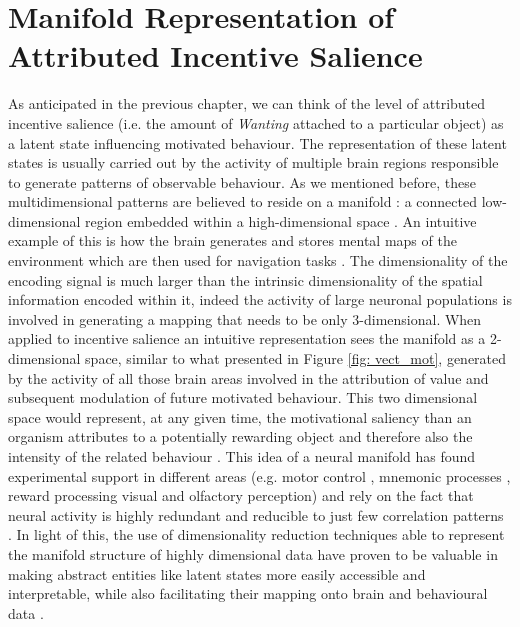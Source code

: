 \section{Manifold Representation of Attributed Incentive Salience}
\label{manifold_rep_incentive_salience}
As anticipated in the previous chapter, we can think of the level of attributed incentive salience (i.e. the amount of \textit{Wanting} attached to a particular object) as a latent state influencing motivated behaviour. The representation of these latent states is usually carried out by the activity of multiple brain regions responsible to generate patterns of observable behaviour. As we mentioned before, these multidimensional patterns are believed to reside on a manifold \cite{seung2000manifold, pang2016dimensionality}: a connected low-dimensional region embedded within a high-dimensional space \cite{bengio2017deep}. An intuitive example of this is how the brain generates and stores mental maps of the environment which are then used for navigation tasks \cite{derdikman2011manifold, nieh2021geometry}. The dimensionality of the encoding signal is much larger than the intrinsic dimensionality of the spatial information encoded within it, indeed the activity of large neuronal populations is involved in generating a mapping that needs to be only 3-dimensional. When applied to incentive salience an intuitive representation sees the manifold as a 2-dimensional space, similar to what presented in Figure \ref{fig: vect_mot}, generated by the activity of all those brain areas involved in the attribution of value and subsequent modulation of future motivated behaviour. This two dimensional space would represent, at any given time, the motivational saliency than an organism attributes to a potentially rewarding object and therefore also the intensity of the related  behaviour \cite{berridge1998role, simpson2016behavioral}. This idea of a neural manifold has found experimental support in different areas (e.g. motor control \cite{gallego2017neural}, mnemonic processes \cite{derdikman2011manifold, nieh2021geometry}, reward processing \cite{bromberg2010coding} visual \cite{seung2000manifold, ganmor2015thesaurus} and olfactory \cite{stopfer2003intensity} perception) and rely on the fact that neural activity is highly redundant and reducible to just few correlation patterns \cite{gallego2017neural}. In light of this, the use of dimensionality reduction techniques able to represent the manifold structure of highly dimensional data have proven to be valuable in making abstract entities like latent states more easily accessible and interpretable, while also facilitating their mapping onto brain \cite{gao2021nonlinear, rue2021decoding} and behavioural data \cite{luxem2020identifying, pereira2020quantifying, mccullough2021unsupervised, shi2021learning}.

